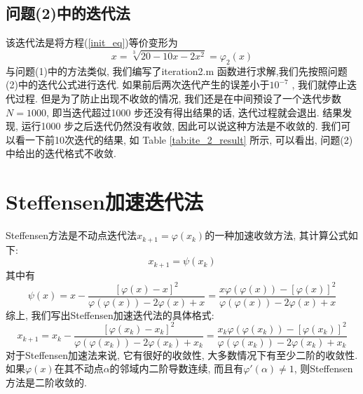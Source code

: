 \documentclass[a4paper]{article}
\begin{document}
\begin{CJK*}{GBK}{song}
\subsection{问题(2)中的迭代法}
该迭代法是将方程(\ref{init_eq})等价变形为
\begin{equation}\label{iter_2}
x=\sqrt[3]{20-10x-2x^2}=\varphi_2(x)
\end{equation}
与问题(1)中的方法类似, 我们编写了iteration2.m 函数进行求解,我们先按照问题(2)中的迭代公式进行迭代. 如果前后两次迭代产生的误差小于$10^{-7}$ , 我们就停止迭代过程. 但是为了防止出现不收敛的情况, 我们还是在中间预设了一个迭代步数$N=1000$, 即当迭代超过1000 步还没有得出结果的话, 迭代过程就会退出. 结果发现, 运行1000 步之后迭代仍然没有收敛, 因此可以说这种方法是不收敛的. 我们可以看一下前10次迭代的结果, 如 Table \ref{tab:ite_2_result} 所示, 可以看出, 问题(2)中给出的迭代格式不收敛.
\begin{center}
\begin{table*}[!htbp]
%
\end{table*}
\end{center}


\section{Steffensen加速迭代法}
Steffensen方法是不动点迭代法$x_{k+1}=\varphi(x_{k})$的一种加速收敛方法, 其计算公式如下:
\begin{equation}
x_{k+1}=\psi(x_{k})
\end{equation}
其中有
\begin{equation}
\psi(x)=x-\frac{[\varphi(x)-x]^2}{\varphi(\varphi(x))-2\varphi(x)+x}=\frac{x\varphi(\varphi(x))-[\varphi(x)]^2}{\varphi(\varphi(x))-2\varphi(x)+x}
\end{equation}
综上, 我们写出Steffensen加速迭代法的具体格式:
\begin{equation}
x_{k+1}=x_k-\frac{[\varphi(x_k)-x_k]^2}{\varphi(\varphi(x_k))-2\varphi(x_k)+x_k}=\frac{x_k\varphi(\varphi(x_k))-[\varphi(x_k)]^2}{\varphi(\varphi(x_k))-2\varphi(x_k)+x_k}
\end{equation}
对于Steffensen加速法来说, 它有很好的收敛性, 大多数情况下有至少二阶的收敛性. 如果$\varphi(x)$在其不动点$\alpha$的邻域内二阶导数连续, 而且有$\varphi'(\alpha)\neq 1$, 则Steffensen方法是二阶收敛的.


\end{CJK*}
\end{document}
